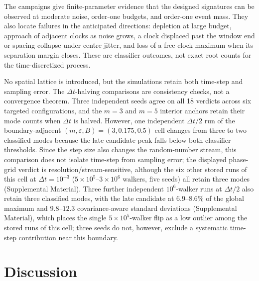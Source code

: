 \documentclass[aps,physrev,reprint,amsmath,amssymb,longbibliography,floatfix]{revtex4-2}
\begin{document}
The campaigns give finite-parameter evidence that the designed signatures
can be observed at moderate noise, order-one budgets, and order-one event
mass.  They also locate failures in the anticipated directions: depletion at
large budget, approach of adjacent clocks as noise grows, a clock displaced
past the window end or spacing collapse under centre jitter, and loss of a
free-clock maximum when its separation margin closes.  These are classifier
outcomes, not exact root counts for the time-discretized process.

No spatial lattice is introduced, but the simulations retain both time-step
and sampling error.  The \(\Delta t\)-halving comparisons are consistency
checks, not a convergence theorem.  Three independent seeds agree on all 18
verdicts across six targeted configurations, and the \(m=3\) and \(m=5\)
interior anchors retain their mode counts when \(\Delta t\) is halved.
However, one independent \(\Delta t/2\) run of the boundary-adjacent
\((m,\varepsilon,B)=(3,0.175,0.5)\) cell changes from three to two classified
modes because the late candidate peak falls below both classifier
thresholds.
Since the step size also changes the random-number stream, this comparison
does not isolate time-step from sampling error; the displayed phase-grid
verdict is resolution/stream-sensitive, although the six other stored runs
of this cell at \(\Delta t=10^{-3}\) (\(5\times10^{5}\)--\(3\times10^{6}\)
walkers, five seeds) all retain three modes (Supplemental Material).
Three further independent \(10^{6}\)-walker runs at \(\Delta t/2\) also
retain three classified modes, with the late candidate at \(6.9\)--\(8.6\%\)
of the global maximum and \(9.8\)--\(12.3\) covariance-aware standard
deviations (Supplemental Material), which places the single
\(5\times10^{5}\)-walker flip as a low outlier among the stored runs of this
cell; three seeds do not, however, exclude a systematic time-step
contribution near this boundary.

\section{Discussion}
\label{sec:discussion}
\end{document}
